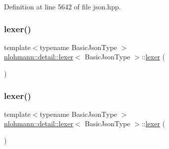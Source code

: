 Definition at line 5642 of file json.\+hpp.

\mbox{\label{classnlohmann_1_1detail_1_1lexer_a2e8ce2a0d266d148b69dfbcc2e4ad71a}} 
\subsubsection{\texorpdfstring{lexer()}{lexer()}\hspace{0.1cm}{\footnotesize\ttfamily [2/3]}}
{\footnotesize\ttfamily template$<$typename Basic\+Json\+Type $>$ \\
\mbox{\hyperlink{classnlohmann_1_1detail_1_1lexer}{nlohmann\+::detail\+::lexer}}$<$ Basic\+Json\+Type $>$\+::\mbox{\hyperlink{classnlohmann_1_1detail_1_1lexer}{lexer}} (\begin{DoxyParamCaption}\item[{const \mbox{\hyperlink{classnlohmann_1_1detail_1_1lexer}{lexer}}$<$ Basic\+Json\+Type $>$ \&}]{ }\end{DoxyParamCaption})\hspace{0.3cm}{\ttfamily [delete]}}

\mbox{\label{classnlohmann_1_1detail_1_1lexer_a9045348915010649fad1f15e80b6e34d}} 
\subsubsection{\texorpdfstring{lexer()}{lexer()}\hspace{0.1cm}{\footnotesize\ttfamily [3/3]}}
{\footnotesize\ttfamily template$<$typename Basic\+Json\+Type $>$ \\
\mbox{\hyperlink{classnlohmann_1_1detail_1_1lexer}{nlohmann\+::detail\+::lexer}}$<$ Basic\+Json\+Type $>$\+::\mbox{\hyperlink{classnlohmann_1_1detail_1_1lexer}{lexer}} (\begin{DoxyParamCaption}\item[{\mbox{\hyperlink{classnlohmann_1_1detail_1_1lexer}{lexer}}$<$ Basic\+Json\+Type $>$ \&\&}]{ }\end{DoxyParamCaption})\hspace{0.3cm}{\ttfamily [delete]}}

